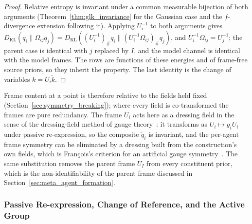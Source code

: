 \begin{proof}
Relative entropy is invariant under a common measurable bijection of both arguments (Theorem~\ref{thm:glk_invariance} for the Gaussian case and the $f$-divergence extension following it). Applying $U_i^{-1}$ to both arguments gives $D_{\mathrm{KL}}(q_i \| \Omega_{ij} q_j) = D_{\mathrm{KL}}((U_i^{-1})_\# q_i \| (U_i^{-1}\Omega_{ij})_\# q_j)$, and $U_i^{-1}\Omega_{ij} = U_j^{-1}$; the parent case is identical with $j$ replaced by $I$, and the model channel is identical with the model frames. The rows are functions of these energies and of frame-free source priors, so they inherit the property. The last identity is the change of variables $k = U_i\tilde k$.
\end{proof}

Frame content at a point is therefore relative to the fields held fixed (Section~\ref{sec:symmetry_breaking}); where every field is co-transformed the frames are pure redundancy. The frame $U_i$ acts here as a dressing field in the sense of the dressing-field method of gauge theory~\cite{Fournel2014Dressing}: it transforms as $U_i \mapsto g_iU_i$ under passive re-expression, so the composite $\tilde q_i$ is invariant, and the per-agent frame symmetry can be eliminated by a dressing built from the construction's own fields, which is Fran\c{c}ois's criterion for an artificial gauge symmetry~\cite{Francois2019Artificial}. The same substitution removes the parent frame $U_I$ from every constituent prior, which is the non-identifiability of the parent frame discussed in Section~\ref{sec:meta_agent_formation}.

\subsubsection{Passive Re-expression, Change of Reference, and the Active Group}
\label{sec:gauge_covariance_principle}


